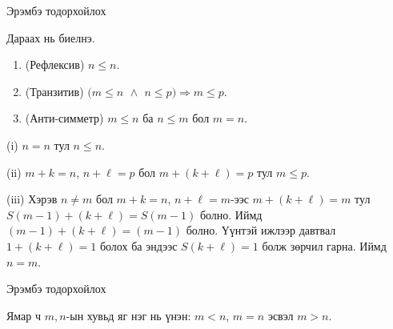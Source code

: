\begin{frame}[allowframebreaks]{Эрэмбэ тодорхойлох}
\begin{theorem}
Дараах нь биелнэ.
\begin{enumerate}\label{erembe}
  \item (Рефлексив) $n\le n$.
  \item (Транзитив) $\big(m\le n\ \,\wedge\,\ n\le p\big)\Rightarrow m\le p$.
  \item (Анти-симметр) $m\le n$ ба $n\le m$ бол $m=n$.
\end{enumerate}
\end{theorem}
\begin{prof}
(i) $n=n$ тул $n\le n$. 

(ii) $m+k=n$, $n+\ell=p$ бол $m+(k+\ell)=p$ тул $m\le p$. 

(iii) Хэрэв $n\neq m$ бол $m+k=n$, $n+\ell=m$-ээс $m+(k+\ell)=m$ тул $S(m-1)+(k+\ell)=S(m-1)$ болно. Иймд $(m-1)+(k+\ell)=(m-1)$ болно. Үүнтэй ижлээр давтвал $1+(k+\ell)=1$ болох ба эндээс $S(k+\ell)=1$ болж зөрчил гарна. Иймд $n=m$.
\end{prof}
\end{frame}

\begin{frame}[allowframebreaks]{Эрэмбэ тодорхойлох}
\begin{theorem}[Трихотом]
Ямар ч $m,n$-ын хувьд яг нэг нь үнэн: $m<n$, $m=n$ эсвэл $m>n$.
\end{theorem}
\end{frame}


